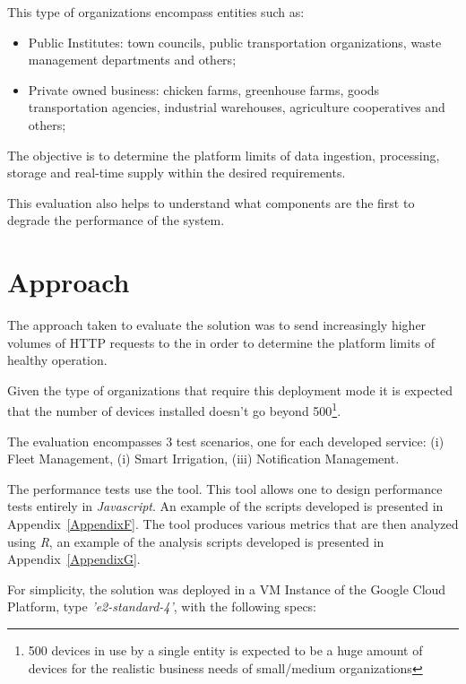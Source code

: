 This type of organizations encompass entities such as:

\begin{itemize}
    \item Public Institutes: town councils, public transportation organizations, waste management departments and others;
    \item Private owned business: chicken farms, greenhouse farms, goods transportation agencies, industrial warehouses, agriculture cooperatives and others;
\end{itemize}

The objective is to determine the platform limits of data ingestion, processing, storage and real-time supply within the desired requirements.

This evaluation also helps to understand what components are the first to degrade the performance of the system.

\section{Approach}
\label{sec:evaluation:approach}

The approach taken to evaluate the solution was to send increasingly higher volumes of HTTP requests to the  in order to determine the platform limits of healthy operation.

Given the type of organizations that require this deployment mode it is expected that the number of devices installed doesn't go beyond 500\footnote{500 devices in use by a single entity is expected to be a huge amount of devices for the realistic business needs of small/medium organizations}.

The evaluation encompasses 3 test scenarios, one for each developed service: (i) Fleet Management, (i) Smart Irrigation, (iii) Notification Management.

The performance tests use the  tool. This tool allows one to design performance tests entirely in \textit{Javascript}. An example of the scripts developed is presented in Appendix~\ref{AppendixF}. The  tool produces various metrics that are then analyzed using \textit{R}, an example of the analysis scripts developed is presented in Appendix~\ref{AppendixG}.

For simplicity, the solution was deployed in a \gls{VM} Instance of the Google Cloud Platform, type \textit{'e2-standard-4'}, with the following specs:

